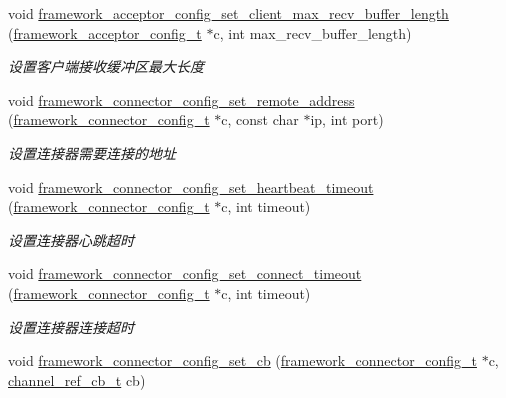 \begin{DoxyCompactItemize}
void \hyperlink{a00103_ga7d46d7c6ac5a9871251b5efab34d767b_ga7d46d7c6ac5a9871251b5efab34d767b}{framework\+\_\+acceptor\+\_\+config\+\_\+set\+\_\+client\+\_\+max\+\_\+recv\+\_\+buffer\+\_\+length} (\hyperlink{a00050_a61a4e424ff4c86631423dedd97c40064_a61a4e424ff4c86631423dedd97c40064}{framework\+\_\+acceptor\+\_\+config\+\_\+t} $\ast$c, int max\+\_\+recv\+\_\+buffer\+\_\+length)
\begin{DoxyCompactList}\small\item\em 设置客户端接收缓冲区最大长度 \end{DoxyCompactList}\item 
void \hyperlink{a00103_ga3d5c40af2faafd53f9ead5cb2ff8c0b0_ga3d5c40af2faafd53f9ead5cb2ff8c0b0}{framework\+\_\+connector\+\_\+config\+\_\+set\+\_\+remote\+\_\+address} (\hyperlink{a00050_a81253f4c995b97e69be0e67f7a26097f_a81253f4c995b97e69be0e67f7a26097f}{framework\+\_\+connector\+\_\+config\+\_\+t} $\ast$c, const char $\ast$ip, int port)
\begin{DoxyCompactList}\small\item\em 设置连接器需要连接的地址 \end{DoxyCompactList}\item 
void \hyperlink{a00103_ga15e1d8ef32fcc99dcc9c35383fa5dbc8_ga15e1d8ef32fcc99dcc9c35383fa5dbc8}{framework\+\_\+connector\+\_\+config\+\_\+set\+\_\+heartbeat\+\_\+timeout} (\hyperlink{a00050_a81253f4c995b97e69be0e67f7a26097f_a81253f4c995b97e69be0e67f7a26097f}{framework\+\_\+connector\+\_\+config\+\_\+t} $\ast$c, int timeout)
\begin{DoxyCompactList}\small\item\em 设置连接器心跳超时 \end{DoxyCompactList}\item 
void \hyperlink{a00103_ga59a35df5173a2f94e5b743fbeeb48f6b_ga59a35df5173a2f94e5b743fbeeb48f6b}{framework\+\_\+connector\+\_\+config\+\_\+set\+\_\+connect\+\_\+timeout} (\hyperlink{a00050_a81253f4c995b97e69be0e67f7a26097f_a81253f4c995b97e69be0e67f7a26097f}{framework\+\_\+connector\+\_\+config\+\_\+t} $\ast$c, int timeout)
\begin{DoxyCompactList}\small\item\em 设置连接器连接超时 \end{DoxyCompactList}\item 
void \hyperlink{a00103_gaaa7b13871a9aca1dbb5ebfe1ece2dde8_gaaa7b13871a9aca1dbb5ebfe1ece2dde8}{framework\+\_\+connector\+\_\+config\+\_\+set\+\_\+cb} (\hyperlink{a00050_a81253f4c995b97e69be0e67f7a26097f_a81253f4c995b97e69be0e67f7a26097f}{framework\+\_\+connector\+\_\+config\+\_\+t} $\ast$c, \hyperlink{a00050_ae296ec4d1ce108960de8dcc423956a1d_ae296ec4d1ce108960de8dcc423956a1d}{channel\+\_\+ref\+\_\+cb\+\_\+t} cb)

\end{DoxyCompactItemize}
